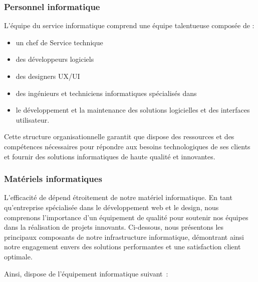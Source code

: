 \subsubsection{Personnel informatique}
L’équipe du service informatique comprend une équipe talentueuse composée de :
\begin{itemize}
  \item un chef de Service technique
  \item des développeurs logiciels
  \item des designers UX/UI
  \item des ingénieurs et techniciens informatiques spécialisés dans
  \item le développement et la maintenance des solutions logicielles et des interfaces utilisateur.
\end{itemize}


Cette structure organisationnelle garantit que \firm dispose des ressources
et des compétences nécessaires pour répondre aux besoins technologiques de ses
clients et fournir des solutions informatiques de haute qualité et innovantes.


\subsubsection { Matériels informatiques }
L’efficacité de \firm dépend étroitement de notre matériel informatique.
En tant qu’entreprise spécialisée dans le développement web et le design, nous
comprenons l’importance d’un équipement de qualité pour soutenir nos équipes dans
la réalisation de projets innovants. Ci-dessous, nous présentons les principaux
composants de notre infrastructure informatique, démontrant ainsi notre engagement
envers des solutions performantes et une satisfaction client optimale.

Ainsi, \firm dispose de l’équipement informatique suivant :

